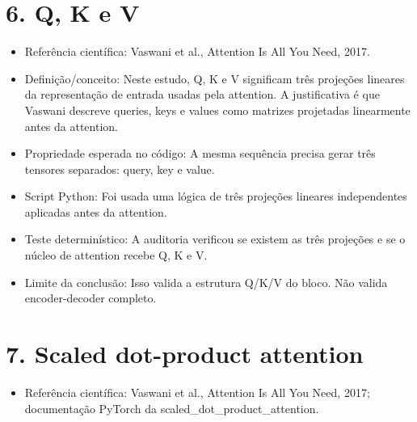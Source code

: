 \section{6. Q, K e V}


\begin{itemize}
\item Referência científica:
Vaswani et al., Attention Is All You Need, 2017.
\end{itemize}

\begin{itemize}
\item Definição/conceito:
Neste estudo, Q, K e V significam três projeções lineares da representação de
entrada usadas pela attention. A justificativa é que Vaswani descreve queries,
keys e values como matrizes projetadas linearmente antes da attention.
\end{itemize}

\begin{itemize}
\item Propriedade esperada no código:
A mesma sequência precisa gerar três tensores separados: query, key e value.
\end{itemize}

\begin{itemize}
\item Script Python:
Foi usada uma lógica de três projeções lineares independentes aplicadas antes
da attention.
\end{itemize}

\begin{itemize}
\item Teste determinístico:
A auditoria verificou se existem as três projeções e se o núcleo de attention
recebe Q, K e V.
\end{itemize}

\begin{itemize}
\item Limite da conclusão:
Isso valida a estrutura Q/K/V do bloco. Não valida encoder-decoder completo.
\end{itemize}



\section{7. Scaled dot-product attention}


\begin{itemize}
\item Referência científica:
Vaswani et al., Attention Is All You Need, 2017; documentação PyTorch da
scaled\_\allowbreak{}dot\_\allowbreak{}product\_\allowbreak{}attention.
\end{itemize}

